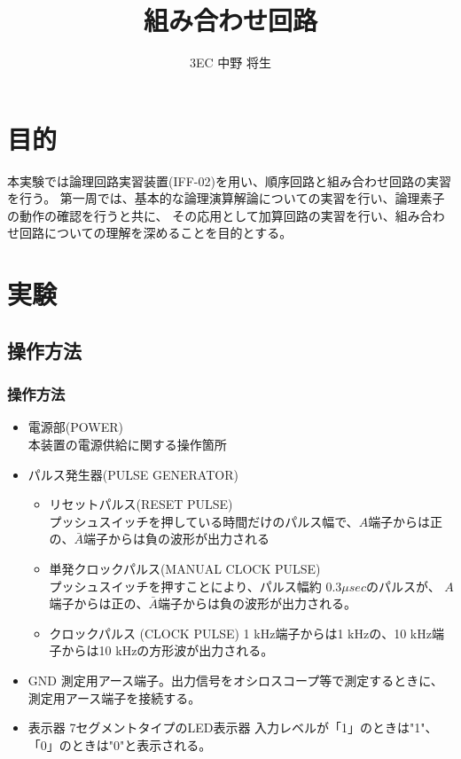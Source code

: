 \documentclass[dvipdfmx,a4paper]{jsarticle}
\begin{document}
	\title{組み合わせ回路}
	\author{3EC 中野 将生}
	\maketitle
	\section{目的}
		本実験では論理回路実習装置(IFF-02)を用い、順序回路と組み合わせ回路の実習を行う。
		第一周では、基本的な論理演算解論についての実習を行い、論理素子の動作の確認を行うと共に、
		その応用として加算回路の実習を行い、組み合わせ回路についての理解を深めることを目的とする。
	\section{実験}
		\subsection{操作方法}
			\subsubsection{操作方法}
				\begin{itemize}
					\item 電源部(POWER) \\
						本装置の電源供給に関する操作箇所
					\item パルス発生器(PULSE GENERATOR)
						\begin{itemize}
							\item リセットパルス(RESET PULSE) \\
								プッシュスイッチを押している時間だけのパルス幅で、$A$端子からは正の、$\bar{A}$端子からは負の波形が出力される
							\item 単発クロックパルス(MANUAL CLOCK PULSE) \\
								プッシュスイッチを押すことにより、パルス幅約 $0.3 \mu sec$のパルスが、
								$A$端子からは正の、$\bar{A}$端子からは負の波形が出力される。
							\item クロックパルス (CLOCK PULSE)
								1 kHz端子からは1 kHzの、10 kHz端子からは10 kHzの方形波が出力される。
						\end{itemize}
					\item GND
						測定用アース端子。出力信号をオシロスコープ等で測定するときに、測定用アース端子を接続する。
					\item 表示器
						7セグメントタイプのLED表示器
						入力レベルが「1」のときは"1"、「0」のときは"0"と表示される。
				\end{itemize}
\end{document}
